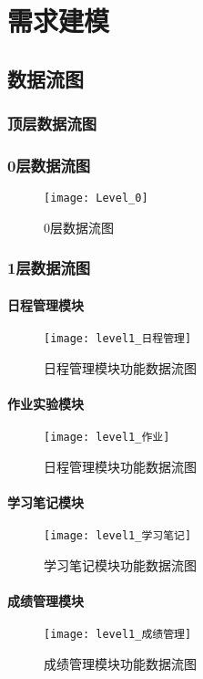 \chapter{需求建模}
\section{数据流图}
\subsection{顶层数据流图}
\subsection{0层数据流图}
\begin{figure}[H]
\centering
\texttt{[image: Level\_0]}
\caption{0层数据流图}
\end{figure}
\subsection{1层数据流图}
\subsubsection{日程管理模块}
\begin{figure}[H]
\centering
\texttt{[image: level1\_日程管理]}
\caption{日程管理模块功能数据流图}
\end{figure}
\subsubsection{作业实验模块}
\begin{figure}[H]
\centering
\texttt{[image: level1\_作业]}
\caption{日程管理模块功能数据流图}
\end{figure}
\subsubsection{学习笔记模块}
\begin{figure}[H]
\centering
\texttt{[image: level1\_学习笔记]}
\caption{学习笔记模块功能数据流图}
\end{figure}
\subsubsection{成绩管理模块}
\begin{figure}[H]
\centering
\texttt{[image: level1\_成绩管理]}
\caption{成绩管理模块功能数据流图}
\end{figure}
